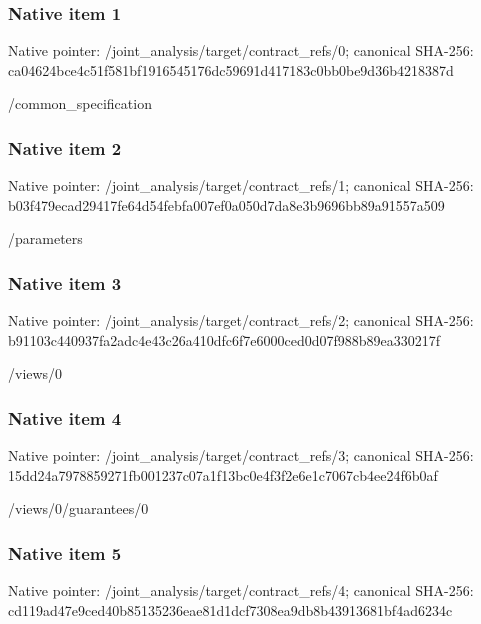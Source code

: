 \documentclass[10pt,a4paper]{article}
\begin{document}
\subsubsection{Native item 1}
Native pointer: /joint\_\allowbreak{}analysis/target/contract\_\allowbreak{}refs/0; canonical SHA-256: ca04624bce4c51f581bf1916545176dc59691d417183c0bb0be9d36b4218387d

\begingroup\raggedright\sloppy /\allowbreak{}common\_\allowbreak{}specification\par\endgroup

\subsubsection{Native item 2}
Native pointer: /joint\_\allowbreak{}analysis/target/contract\_\allowbreak{}refs/1; canonical SHA-256: b03f479ecad29417fe64d54febfa007ef0a050d7da8e3b9696bb89a91557a509

\begingroup\raggedright\sloppy /\allowbreak{}parameters\par\endgroup

\subsubsection{Native item 3}
Native pointer: /joint\_\allowbreak{}analysis/target/contract\_\allowbreak{}refs/2; canonical SHA-256: b91103c440937fa2adc4e43c26a410dfc6f7e6000ced0d07f988b89ea330217f

\begingroup\raggedright\sloppy /\allowbreak{}views/\allowbreak{}0\par\endgroup

\subsubsection{Native item 4}
Native pointer: /joint\_\allowbreak{}analysis/target/contract\_\allowbreak{}refs/3; canonical SHA-256: 15dd24a7978859271fb001237c07a1f13bc0e4f3f2e6e1c7067cb4ee24f6b0af

\begingroup\raggedright\sloppy /\allowbreak{}views/\allowbreak{}0/\allowbreak{}guarantees/\allowbreak{}0\par\endgroup

\subsubsection{Native item 5}
Native pointer: /joint\_\allowbreak{}analysis/target/contract\_\allowbreak{}refs/4; canonical SHA-256: cd119ad47e9ced40b85135236eae81d1dcf7308ea9db8b43913681bf4ad6234c
\end{document}
